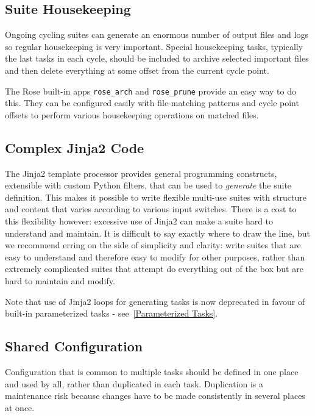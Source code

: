 \subsection{Suite Housekeeping}
\label{Suite Housekeeping}

Ongoing cycling suites can generate an enormous number of output files and logs
so regular housekeeping is very important. Special housekeeping tasks,
typically the last tasks in each cycle, should be included to archive selected
important files and then delete everything at some offset from the current
cycle point.

The Rose built-in apps \lstinline=rose_arch= and \lstinline=rose_prune=
provide an easy way to do this. They can be configured easily with
file-matching patterns and cycle point offsets to perform various housekeeping
operations on matched files.

\subsection{Complex Jinja2 Code}

The Jinja2 template processor provides general programming constructs,
extensible with custom Python filters, that can be used to {\em generate} the
suite definition. This makes it possible to write flexible multi-use
suites with structure and content that varies according to various input
switches. There is a cost to this flexibility however: excessive use of Jinja2
can make a suite hard to understand and maintain. It is difficult to say
exactly where to draw the line, but we recommend erring on the side of
simplicity and clarity: write suites that are easy to understand and therefore
easy to modify for other purposes, rather than extremely complicated suites
that attempt do everything out of the box but are hard to maintain and modify.

Note that use of Jinja2 loops for generating tasks is now deprecated in favour
of built-in parameterized tasks - see~\ref{Parameterized Tasks}.

\subsection{Shared Configuration}

Configuration that is common to multiple tasks should be defined in one
place and used by all, rather than duplicated in each task. Duplication is
a maintenance risk because changes have to be made consistently in several
places at once.

